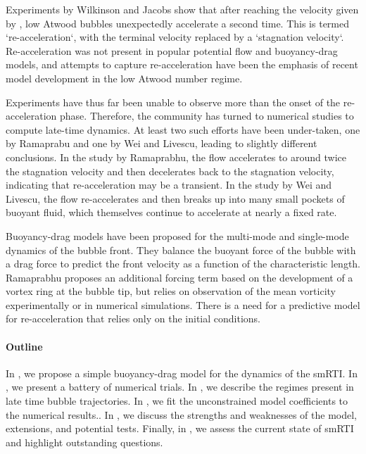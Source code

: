 Experiments by Wilkinson and Jacobs show that after reaching the velocity given by , low Atwood bubbles unexpectedly accelerate a second time.
This is termed `re-acceleration`, with the terminal velocity replaced by a `stagnation velocity`.
Re-acceleration was not present in popular potential flow and buoyancy-drag models, and attempts to capture re-acceleration have been the emphasis of recent model development in the low Atwood number regime.

Experiments have thus far been unable to observe more than the onset of the re-acceleration phase.
Therefore, the community has turned to numerical studies to compute late-time dynamics.
At least two such efforts have been under-taken, one by Ramaprabu \etal and one by Wei and Livescu, leading to slightly different conclusions.
In the study by Ramaprabhu, the flow accelerates to around twice the stagnation velocity and then decelerates back to the stagnation velocity, indicating that re-acceleration may be a transient.
In the study by Wei and Livescu, the flow re-accelerates and then breaks up into many small pockets of buoyant fluid, which themselves continue to accelerate at nearly a fixed rate.

Buoyancy-drag models have been proposed for the multi-mode and single-mode dynamics of the bubble front.
They balance the buoyant force of the bubble with a drag force to predict the front velocity as a function of the characteristic length.
Ramaprabhu proposes an additional forcing term based on the development of a vortex ring at the bubble tip, but relies on observation of the mean vorticity experimentally or in numerical simulations.
There is a need for a predictive model for re-acceleration that relies only on the initial conditions.

\paragraph{Outline}
In , we propose a simple buoyancy-drag model for the dynamics of the smRTI.
In , we present a battery of numerical trials.
In , we describe the regimes present in late time bubble trajectories.
In , we fit the unconstrained model coefficients to the numerical results..
In , we discuss the strengths and weaknesses of the model, extensions, and potential tests.
Finally, in , we assess the current state of smRTI and highlight outstanding questions.

